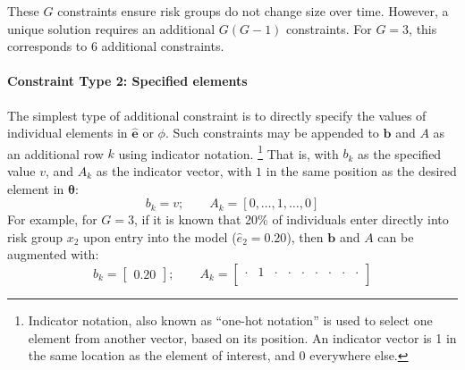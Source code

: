 These $G$ constraints ensure risk groups do not change size over time.
However, a unique solution requires
an additional $G(G-1)$ constraints.
For $G = 3$, this corresponds to 6 additional constraints.
\paragraph{Constraint Type 2: Specified elements}
\label{con:spec-element}
The simplest type of additional constraint is to
directly specify the values of individual elements in $\bm{\hat{e}}$ or $\phi$.
Such constraints may be appended to $\bm{b}$ and $A$
as an additional row $k$ using indicator notation.%
\footnote{Indicator notation, also known as ``one-hot notation'' is used to
  select one element from another vector, based on its position.
  An indicator vector is 1 in the same location as the element of interest,
  and 0 everywhere else.}
That is, with $b_k$ as the specified value $v$,
and $A_k$ as the indicator vector,
with $1$ in the same position as the desired element in $\bm{\theta}$:
\begin{equation}\label{eq:spec-elem}
  b_k = v;\qquad
  A_k = [0,\dots,1,\dots,0]
\end{equation}
For example, for $G = 3$, if it is known that 20\% of individuals
enter directly into risk group $x_2$ upon entry into the model ($\hat{e}_2 = 0.20$),
then $\bm{b}$ and $A$ can be augmented with:
\begin{equation}\label{eq:eg-spec}
b_k = \left[\begin{array}{c} 0.20 \end{array}\right];\qquad
A_k = \left[\begin{array}{ccccccccc}
\cdot & 1 & \cdot & \cdot & \cdot & \cdot & \cdot & \cdot & \cdot \\
\end{array}\right] 
\end{equation}
